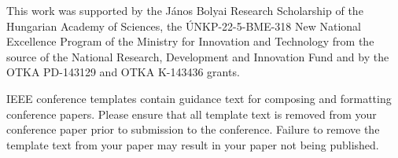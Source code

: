 \documentclass[conference]{IEEEtran}
\begin{document}
This work was supported by the János Bolyai Research Scholarship of the Hungarian Academy of Sciences, the ÚNKP-22-5-BME-318 New National Excellence Program of the Ministry for Innovation and Technology from the source of the National Research, Development and Innovation Fund
and by the OTKA PD-143129 and OTKA K-143436 grants.



\vspace{12pt}
\color{red}
IEEE conference templates contain guidance text for composing and formatting conference papers. Please ensure that all template text is removed from your conference paper prior to submission to the conference. Failure to remove the template text from your paper may result in your paper not being published.
\end{document}
